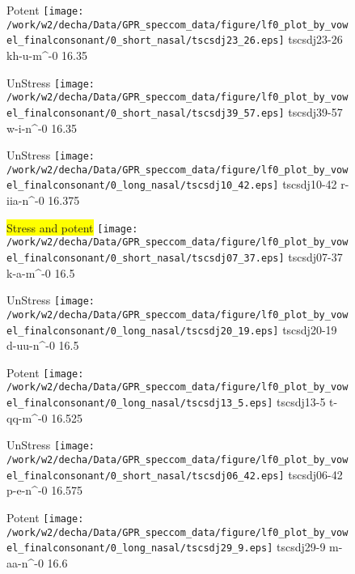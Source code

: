 \documentclass{article}
\begin{document}
\begin{figure}[t]
\begin{minipage}[b]{.24\textwidth}
\colorbox{Apricot}{Potent}
\centering
\texttt{[image: /work/w2/decha/Data/GPR\_speccom\_data/figure/lf0\_plot\_by\_vowel\_finalconsonant/0\_short\_nasal/tscsdj23\_26.eps]}
tscsdj23-26 kh-u-m\textasciicircum-0 16.35
\end{minipage}
\begin{minipage}[b]{.24\textwidth}
UnStress
\centering
\texttt{[image: /work/w2/decha/Data/GPR\_speccom\_data/figure/lf0\_plot\_by\_vowel\_finalconsonant/0\_short\_nasal/tscsdj39\_57.eps]}
tscsdj39-57 w-i-n\textasciicircum-0 16.35
\end{minipage}
\begin{minipage}[b]{.24\textwidth}
UnStress
\centering
\texttt{[image: /work/w2/decha/Data/GPR\_speccom\_data/figure/lf0\_plot\_by\_vowel\_finalconsonant/0\_long\_nasal/tscsdj10\_42.eps]}
tscsdj10-42 r-iia-n\textasciicircum-0 16.375
\end{minipage}
\begin{minipage}[b]{.24\textwidth}
\colorbox{yellow}{Stress and potent}
\centering
\texttt{[image: /work/w2/decha/Data/GPR\_speccom\_data/figure/lf0\_plot\_by\_vowel\_finalconsonant/0\_short\_nasal/tscsdj07\_37.eps]}
tscsdj07-37 k-a-m\textasciicircum-0 16.5
\end{minipage}
\end{figure}
\clearpage
\begin{figure}[t]
\begin{minipage}[b]{.24\textwidth}
UnStress
\centering
\texttt{[image: /work/w2/decha/Data/GPR\_speccom\_data/figure/lf0\_plot\_by\_vowel\_finalconsonant/0\_long\_nasal/tscsdj20\_19.eps]}
tscsdj20-19 d-uu-n\textasciicircum-0 16.5
\end{minipage}
\begin{minipage}[b]{.24\textwidth}
\colorbox{Apricot}{Potent}
\centering
\texttt{[image: /work/w2/decha/Data/GPR\_speccom\_data/figure/lf0\_plot\_by\_vowel\_finalconsonant/0\_long\_nasal/tscsdj13\_5.eps]}
tscsdj13-5 t-qq-m\textasciicircum-0 16.525
\end{minipage}
\begin{minipage}[b]{.24\textwidth}
UnStress
\centering
\texttt{[image: /work/w2/decha/Data/GPR\_speccom\_data/figure/lf0\_plot\_by\_vowel\_finalconsonant/0\_short\_nasal/tscsdj06\_42.eps]}
tscsdj06-42 p-e-n\textasciicircum-0 16.575
\end{minipage}
\begin{minipage}[b]{.24\textwidth}
\colorbox{Apricot}{Potent}
\centering
\texttt{[image: /work/w2/decha/Data/GPR\_speccom\_data/figure/lf0\_plot\_by\_vowel\_finalconsonant/0\_long\_nasal/tscsdj29\_9.eps]}
tscsdj29-9 m-aa-n\textasciicircum-0 16.6
\end{minipage}
\end{figure}
\end{document}
